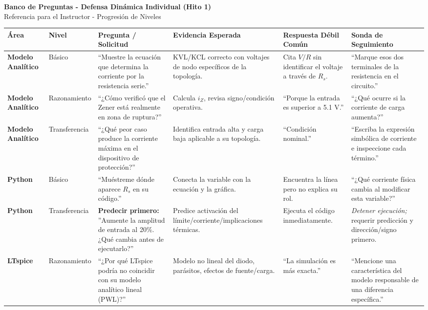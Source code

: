 \documentclass[10pt, a4paper, landscape]{article}
\begin{document}
\begin{center}
    {\Large \textbf{Banco de Preguntas - Defensa Dinámica Individual (Hito 1)}}\\[0.2cm]
    {\large Referencia para el Instructor - Progresión de Niveles}
\end{center}

\renewcommand{\arraystretch}{1.3}
\begin{tabularx}{\textwidth}{>{\bfseries}l l X X X X}
\toprule
Área & Nivel & Pregunta / Solicitud & Evidencia Esperada & Respuesta Débil Común & Sonda de Seguimiento \\
\midrule
Modelo Analítico & Básico & ``Muestre la ecuación que determina la corriente por la resistencia serie.'' & KVL/KCL correcto con voltajes de nodo específicos de la topología. & Cita $V/R$ sin identificar el voltaje a través de $R_s$. & ``Marque esos dos terminales de la resistencia en el circuito.'' \\
\midrule
Modelo Analítico & Razonamiento & ``¿Cómo verificó que el Zener está realmente en zona de ruptura?'' & Calcula $i_Z$, revisa signo/condición operativa. & ``Porque la entrada es superior a 5.1 V.'' & ``¿Qué ocurre si la corriente de carga aumenta?'' \\
\midrule
Modelo Analítico & Transferencia & ``¿Qué peor caso produce la corriente máxima en el dispositivo de protección?'' & Identifica entrada alta y carga baja aplicable a su topología. & ``Condición nominal.'' & ``Escriba la expresión simbólica de corriente e inspeccione cada término.'' \\
\midrule
Python & Básico & ``Muéstreme dónde aparece $R_s$ en su código.'' & Conecta la variable con la ecuación y la gráfica. & Encuentra la línea pero no explica su rol. & ``¿Qué corriente física cambia al modificar esta variable?'' \\
\midrule
Python & Transferencia & \textbf{Predecir primero:} ''Aumente la amplitud de entrada al 20\%. ¿Qué cambia antes de ejecutarlo?'' & Predice activación del límite/corriente/implicaciones térmicas. & Ejecuta el código inmediatamente. & \textit{Detener ejecución;} requerir predicción y dirección/signo primero. \\
\midrule
LTspice & Razonamiento & ``¿Por qué LTspice podría no coincidir con su modelo analítico lineal (PWL)?'' & Modelo no lineal del diodo, parásitos, efectos de fuente/carga. & ``La simulación es más exacta.'' & ``Mencione una característica del modelo responsable de una diferencia específica.'' \\
\midrule

\end{tabularx}
\end{document}
